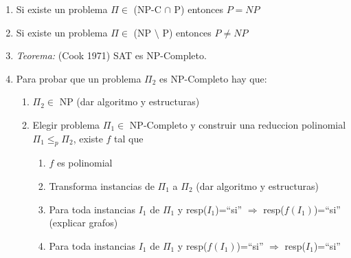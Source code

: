 \begin{enumerate}
\item Si existe un problema $\Pi \in$ (NP-C $\cap$ P) entonces $P=NP$
\item Si existe un problema $\Pi \in$ (NP $\setminus$ P) entonces $P\neq NP$
\item \textit{Teorema:} (Cook 1971) SAT es NP-Completo.
\item Para probar que un problema $\Pi_{2}$ es NP-Completo hay que:
   \begin{enumerate}
   \item $\Pi_{2} \in$ NP (dar algoritmo y estructuras)
   \item Elegir problema $\Pi_{1} \in$ NP-Completo y construir una reduccion polinomial $\Pi_{1} \leq_{p} \Pi_{2}$, existe $f$ tal que
      \begin{enumerate}
      \item $f$ es polinomial
      \item Transforma instancias de $\Pi_{1}$ a $\Pi_{2}$ (dar algoritmo y estructuras)
      \item Para toda instancias $I_{1}$ de $\Pi_{1}$ y resp($I_{1}$)=``si'' $\Rightarrow$ resp($f(I_{1})$)=``si'' (explicar grafos)
      \item Para toda instancias $I_{1}$ de $\Pi_{1}$ y resp($f(I_{1})$)=``si'' $\Rightarrow$ resp($I_{1}$)=``si''
      \end{enumerate}
   \end{enumerate}
\end{enumerate}
